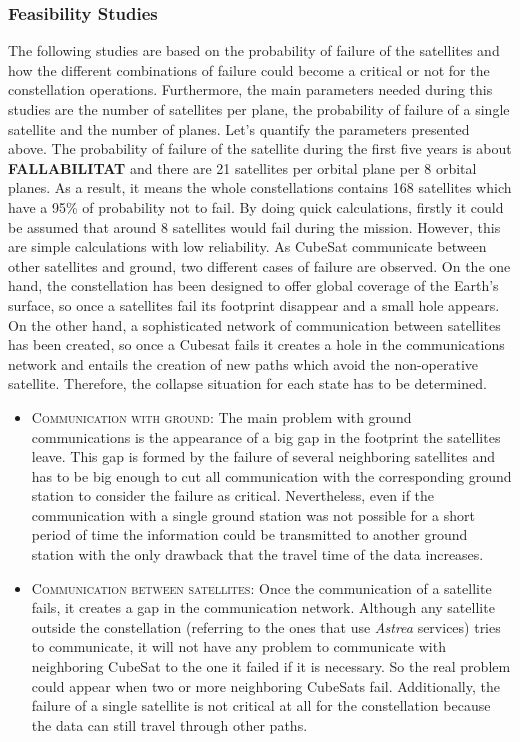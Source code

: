 \subsubsection{Feasibility Studies}
The following studies are based on the probability of failure of the satellites and how the different combinations of failure could become a critical or not for the constellation operations. Furthermore, the main parameters needed during this studies are the number of satellites per plane, the probability of failure of a single satellite and the number of planes. 
\newline
\newline
Let's quantify the parameters presented above. The probability of failure of the satellite during the first five years is about \textbf{FALLABILITAT} and there are 21 satellites per orbital plane per 8 orbital planes. As a result, it means the whole constellations contains 168 satellites which have a 95\% of probability not to fail. By doing quick calculations, firstly it could be assumed that around 8 satellites would fail during the mission. However, this are simple calculations with low reliability.
\newline
\newline
As CubeSat communicate between other satellites and ground, two different cases of failure are observed. On the one hand, the constellation has been designed to offer global coverage of the Earth's surface, so once a satellites fail its footprint disappear and a small hole appears. On the other hand, a sophisticated network of communication between satellites has been created, so once a Cubesat fails it creates a hole in the communications network and entails the creation of new paths which avoid the non-operative satellite. Therefore, the collapse situation for each state has to be determined.
\newline
\begin{itemize}
\item \textsc{Communication with ground:}
The main problem with ground communications is the appearance of a big gap in the footprint the satellites leave. This gap is formed by the failure of several neighboring satellites and has to be big enough to cut all communication with the corresponding ground station to consider the failure as critical. Nevertheless, even if the communication with a single ground station was not possible for a short period of time the information could be transmitted to another ground station with the only drawback that the travel time of the data increases.   
\item \textsc{Communication between satellites:}
Once the communication of a satellite fails, it creates a gap in the communication network. Although any satellite outside the constellation (referring to the ones that use \textit{Astrea} services) tries to communicate, it will not have any problem to communicate with neighboring CubeSat to the one it failed if it is necessary. So the real problem could appear when two or more neighboring CubeSats fail. Additionally, the failure of a single satellite is not critical at all for the constellation because the data can still travel through other paths. 

\end{itemize}

 